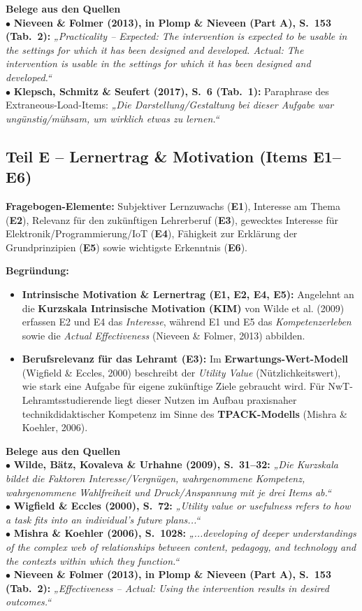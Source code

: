 \documentclass[a4paper,10pt]{article}
\newcommand{\quotebox}[2]{%
  \begin{tcolorbox}[
    colback=lightgray,
    colframe=accent,
    arc=1.5mm,
    boxrule=0pt,
    leftrule=3pt,
    top=5pt, bottom=5pt, left=8pt, right=8pt
  ]
  {\small \textbf{\color{primary} #1}\\[2pt]
  #2}
  \end{tcolorbox}
}
\begin{document}
\quotebox{Belege aus den Quellen}{
$\bullet$ \textbf{Nieveen \& Folmer (2013), in Plomp \& Nieveen (Part A), S.~153 (Tab.~2):} \textit{„Practicality – Expected: The intervention is expected to be usable in the settings for which it has been designed and developed. Actual: The intervention is usable in the settings for which it has been designed and developed.“}\\[3pt]
$\bullet$ \textbf{Klepsch, Schmitz \& Seufert (2017), S.~6 (Tab.~1):} Paraphrase des Extraneous-Load-Items: \textit{„Die Darstellung/Gestaltung bei dieser Aufgabe war ungünstig/mühsam, um wirklich etwas zu lernen.“}
}

\subsection*{\color{primary} Teil E – Lernertrag \& Motivation (Items E1–E6)}
\textbf{Fragebogen-Elemente:} Subjektiver Lernzuwachs (\textbf{E1}), Interesse am Thema (\textbf{E2}), Relevanz für den zukünftigen Lehrerberuf (\textbf{E3}), gewecktes Interesse für Elektronik/Programmierung/IoT (\textbf{E4}), Fähigkeit zur Erklärung der Grundprinzipien (\textbf{E5}) sowie wichtigste Erkenntnis (\textbf{E6}).

\textbf{Begründung:}
\begin{itemize}[leftmargin=1.5em, itemsep=1pt, topsep=1pt]
  \item \textbf{Intrinsische Motivation \& Lernertrag (E1, E2, E4, E5):} Angelehnt an die \textbf{Kurzskala Intrinsische Motivation (KIM)} von Wilde et al. (2009) erfassen E2 und E4 das \textit{Interesse}, während E1 und E5 das \textit{Kompetenzerleben} sowie die \textit{Actual Effectiveness} (Nieveen \& Folmer, 2013) abbilden.
  \item \textbf{Berufsrelevanz für das Lehramt (E3):} Im \textbf{Erwartungs-Wert-Modell} (Wigfield \& Eccles, 2000) beschreibt der \textit{Utility Value} (Nützlichkeitswert), wie stark eine Aufgabe für eigene zukünftige Ziele gebraucht wird. Für NwT-Lehramtsstudierende liegt dieser Nutzen im Aufbau praxisnaher technikdidaktischer Kompetenz im Sinne des \textbf{TPACK-Modells} (Mishra \& Koehler, 2006).
\end{itemize}

\quotebox{Belege aus den Quellen}{
$\bullet$ \textbf{Wilde, Bätz, Kovaleva \& Urhahne (2009), S.~31–32:} \textit{„Die Kurzskala bildet die Faktoren Interesse/Vergnügen, wahrgenommene Kompetenz, wahrgenommene Wahlfreiheit und Druck/Anspannung mit je drei Items ab.“}\\[3pt]
$\bullet$ \textbf{Wigfield \& Eccles (2000), S.~72:} \textit{„Utility value or usefulness refers to how a task fits into an individual’s future plans...“}\\[3pt]
$\bullet$ \textbf{Mishra \& Koehler (2006), S.~1028:} \textit{„...developing of deeper understandings of the complex web of relationships between content, pedagogy, and technology and the contexts within which they function.“}\\[3pt]
$\bullet$ \textbf{Nieveen \& Folmer (2013), in Plomp \& Nieveen (Part A), S.~153 (Tab.~2):} \textit{„Effectiveness – Actual: Using the intervention results in desired outcomes.“}
}
\end{document}

